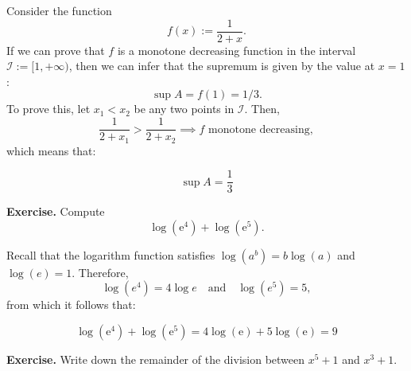 \documentclass[a4paper,10 pt]{report}
\newcommand{\finalanswer}[1]{%
    \begin{finalAnswer}
    \[
        #1
    \]
    \end{finalAnswer}
}
\theoremstyle{definition}
\begin{document}
\begin{solutionBox} Consider the function 
\[
f(x) := \frac{1}{2 + x}.
\]
If we can prove that $f$ is a monotone decreasing function in the interval $\mathcal{I} := [1, + \infty)$, then we can infer that the supremum is given by the value at $x=1$:
\[
\sup A = f(1) = 1/3.
\]
To prove this, let $x_1 < x_2$ be any two points in $\mathcal{I}$. Then,
\begin{equation*} \frac{1}{2 + x_1} > \frac{1}{2 + x_2} \implies \text{$f$ monotone decreasing},  \end{equation*}
which means that:
\begin{tcolorbox}[
    enhanced,
    colback=blue!5,
    colframe=blue!75!black,
    arc=0pt,
    boxrule=1pt,
    title=Final Answer,
    fonttitle=\bfseries,
    attach boxed title to top left={xshift=0mm, yshift=-\tcboxedtitleheight/2},
    boxed title style={
        colback=blue!75!black,
        coltext=white
    }
]
\[
    \sup A = \frac{1}{3}
\]
\end{tcolorbox}
\end{solutionBox}

\begin{exerciseBox}

\textbf{Exercise.} Compute
\[
\log(\mathrm{e}^4) + \log(\mathrm{e}^5).
\]

\end{exerciseBox}

\begin{solutionBox}
	Recall that the logarithm function satisfies $\log(a^b) = b \log(a)$ and $\log(e) = 1$. Therefore,
	\[
	\log(e^4) = 4 \log e \quad \text{and} \quad \log(e^5) = 5,
	\]
	from which it follows that:
\finalanswer{\log(\mathrm{e}^4) + \log(\mathrm{e}^5) = 4 \log(\mathrm{e}) + 5 \log(\mathrm{e}) = 9}
\end{solutionBox}


\begin{exerciseBox}
\textbf{Exercise.} Write down the remainder of the division between $x^5 + 1$ and $x^3 + 1$.
\end{exerciseBox}
\end{document}
